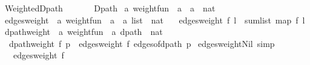 %
\begin{isabellebody}%
%
%
\isadeliminvisible
%
\endisadeliminvisible
%
\isataginvisible
{}\isamarkupfalse%
\ Weighted{\isacharunderscore}{\kern0pt}Dpath\isanewline
\ \ \isanewline
\ \ \ \ Dpath\isanewline
{}\isanewline
\isanewline
{}\isamarkupfalse%
\ {\isacharprime}{\kern0pt}a\ weight{\isacharunderscore}{\kern0pt}fun\ {\isacharequal}{\kern0pt}\ {\isachardoublequoteopen}{\isacharprime}{\kern0pt}a\ {\isasymtimes}\ {\isacharprime}{\kern0pt}a\ {\isasymRightarrow}\ nat{\isachardoublequoteclose}\isanewline
\isanewline
{}\isamarkupfalse%
\ edges{\isacharunderscore}{\kern0pt}weight\ {\isacharcolon}{\kern0pt}{\isacharcolon}{\kern0pt}\ {\isachardoublequoteopen}{\isacharprime}{\kern0pt}a\ weight{\isacharunderscore}{\kern0pt}fun\ {\isasymRightarrow}\ {\isacharparenleft}{\kern0pt}{\isacharprime}{\kern0pt}a\ {\isasymtimes}\ {\isacharprime}{\kern0pt}a{\isacharparenright}{\kern0pt}\ list\ {\isasymRightarrow}\ nat{\isachardoublequoteclose}\ \isanewline
\ \ {\isachardoublequoteopen}edges{\isacharunderscore}{\kern0pt}weight\ f\ l\ {\isacharequal}{\kern0pt}\ sum{\isacharunderscore}{\kern0pt}list\ {\isacharparenleft}{\kern0pt}map\ f\ l{\isacharparenright}{\kern0pt}{\isachardoublequoteclose}\isanewline
\isanewline
{}\isamarkupfalse%
\ dpath{\isacharunderscore}{\kern0pt}weight\ {\isacharcolon}{\kern0pt}{\isacharcolon}{\kern0pt}\ {\isachardoublequoteopen}{\isacharprime}{\kern0pt}a\ weight{\isacharunderscore}{\kern0pt}fun\ {\isasymRightarrow}\ {\isacharprime}{\kern0pt}a\ dpath\ {\isasymRightarrow}\ nat{\isachardoublequoteclose}\ \isanewline
\ \ {\isachardoublequoteopen}dpath{\isacharunderscore}{\kern0pt}weight\ f\ p\ {\isacharequal}{\kern0pt}\ edges{\isacharunderscore}{\kern0pt}weight\ f\ {\isacharparenleft}{\kern0pt}edges{\isacharunderscore}{\kern0pt}of{\isacharunderscore}{\kern0pt}dpath\ p{\isacharparenright}{\kern0pt}{\isachardoublequoteclose}\isanewline
\isanewline
{}\isamarkupfalse%
\ edges{\isacharunderscore}{\kern0pt}weight{\isacharunderscore}{\kern0pt}Nil\ {\isacharbrackleft}{\kern0pt}simp{\isacharbrackright}{\kern0pt}{\isacharcolon}{\kern0pt}\isanewline
\ \ \ {\isachardoublequoteopen}edges{\isacharunderscore}{\kern0pt}weight\ f\ {\isacharbrackleft}{\kern0pt}{\isacharbrackright}{\kern0pt}\ {\isacharequal}{\kern0pt}\ {}{\isachardoublequoteclose}%

\end{isabellebody}
